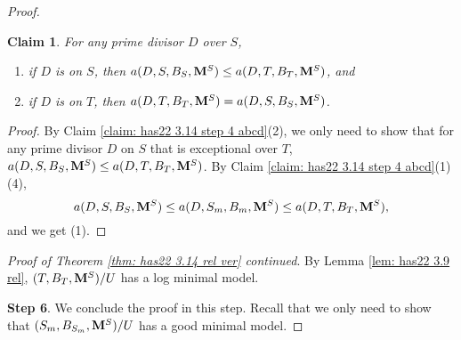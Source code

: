 \documentclass[11pt]{amsart}
\numberwithin{equation}{section}
\newcommand{\Mm}{{\bf{M}}}
\newtheorem{claim}[thm]{Claim}
\theoremstyle{definition}
\theoremstyle{definition}
\theoremstyle{definition}
\begin{document}
\begin{proof}
\begin{claim}\label{lem: has22 3.14 claim rel version}
For any prime divisor $D$ over $S$,
\begin{enumerate}
    \item if $D$ is on $S$, then $a(D,S,B_S,\Mm^S)\leq a(D,T,B_T,\Mm^S)$, and
    \item if $D$ is on $T$, then $a(D,T,B_T,\Mm^S)= a(D,S,B_S,\Mm^S)$.
\end{enumerate}
\end{claim}
\begin{proof}
By Claim \ref{claim: has22 3.14 step 4 abcd}(2), we only need to show that for any prime divisor $D$ on $S$ that is exceptional over $T$, $a(D,S,B_S,\Mm^S)\leq a(D,T,B_T,\Mm^S)$. By Claim \ref{claim: has22 3.14 step 4 abcd}(1)(4), $$a(D,S,B_S,\Mm^S)\leq a(D,S_m,B_m,\Mm^S)\leq a(D,T,B_T,\Mm^S),$$
and we get (1).
\end{proof}

\noindent\textit{Proof of Theorem \ref{thm: has22 3.14 rel ver} continued}. By Lemma \ref{lem: has22 3.9 rel}, $(T,B_T,\Mm^S)/U$ has a log minimal model.

\medskip

\noindent\textbf{Step 6}. We conclude the proof in this step. Recall that we only need to show that $(S_m,B_{S_m},\Mm^S)/U$ has a good minimal model.


\end{proof}
\end{document}
